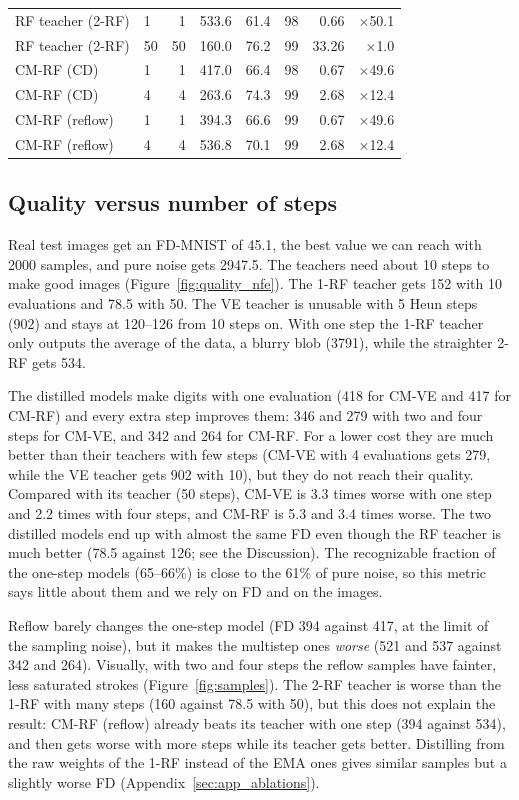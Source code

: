 \documentclass{article}
\begin{document}
\begin{table}[!htbp]
\begin{tabular}{llrrrrrr}
    RF teacher (2-RF) & 1 & 1 & 533.6 & 61.4 & 98 & 0.66 & $\times$50.1 \\
    RF teacher (2-RF) & 50 & 50 & 160.0 & 76.2 & 99 & 33.26 & $\times$1.0 \\
    \midrule
    CM-RF (CD) & 1 & 1 & 417.0 & 66.4 & 98 & 0.67 & $\times$49.6 \\
    CM-RF (CD) & 4 & 4 & 263.6 & 74.3 & 99 & 2.68 & $\times$12.4 \\
    \midrule
    CM-RF (reflow) & 1 & 1 & 394.3 & 66.6 & 99 & 0.67 & $\times$49.6 \\
    CM-RF (reflow) & 4 & 4 & 536.8 & 70.1 & 99 & 2.68 & $\times$12.4 \\
    \bottomrule
  \end{tabular}
\end{table}

\subsection{Quality versus number of steps}

Real test images get an FD-MNIST of 45.1, the best value we can reach with 2000
samples, and pure noise gets 2947.5. The teachers need about 10 steps to make
good images (Figure~\ref{fig:quality_nfe}). The 1-RF teacher gets 152 with 10
evaluations and 78.5 with 50. The VE teacher is unusable with 5 Heun steps (902)
and stays at 120--126 from 10 steps on. With one step the 1-RF teacher only
outputs the average of the data, a blurry blob (3791), while the straighter 2-RF
gets 534.

The distilled models make digits with one evaluation (418 for CM-VE and 417 for
CM-RF) and every extra step improves them: 346 and 279 with two and four steps
for CM-VE, and 342 and 264 for CM-RF. For a lower cost they are much better than
their teachers with few steps (CM-VE with 4 evaluations gets 279, while the VE
teacher gets 902 with 10), but they do not reach their quality. Compared with its
teacher (50 steps), CM-VE is 3.3 times worse with one step and 2.2 times with
four steps, and CM-RF is 5.3 and 3.4 times worse. The two distilled models end up
with almost the same FD even though the RF teacher is much better (78.5 against
126; see the Discussion). The recognizable fraction of the one-step models
(65--66\%) is close to the 61\% of pure noise, so this metric says little about
them and we rely on FD and on the images.

Reflow barely changes the one-step model (FD 394 against 417, at the limit of the
sampling noise), but it makes the multistep ones \emph{worse} (521 and 537 against
342 and 264). Visually, with two and four steps the reflow samples have fainter, less
saturated strokes (Figure~\ref{fig:samples}). The 2-RF teacher is worse than the
1-RF with many steps (160 against 78.5 with 50), but this does not explain the
result: CM-RF (reflow) already beats its teacher with one step (394 against 534),
and then gets worse with more steps while its teacher gets better. Distilling from the raw weights of the 1-RF
instead of the EMA ones gives similar samples but a slightly worse FD
(Appendix~\ref{sec:app_ablations}).
\end{document}

